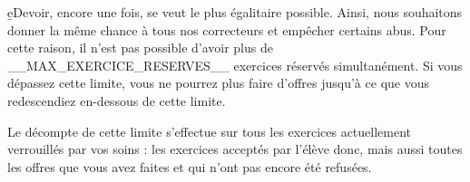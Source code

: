 ﻿\b{eDevoir}, encore une fois, se veut le plus égalitaire possible. Ainsi, nous souhaitons donner la même chance à tous nos correcteurs et empêcher certains abus. Pour cette raison, il n'est pas possible d'avoir plus de __MAX_EXERCICE_RESERVES__ exercices réservés simultanément. Si vous dépassez cette limite, vous ne pourrez plus faire d'offres jusqu'à ce que vous redescendiez en-dessous de cette limite.

Le décompte de cette limite s'effectue sur tous les exercices actuellement verrouillés par vos soins : les exercices acceptés par l'élève donc, mais aussi toutes les offres que vous avez faites et qui n'ont pas encore été refusées.